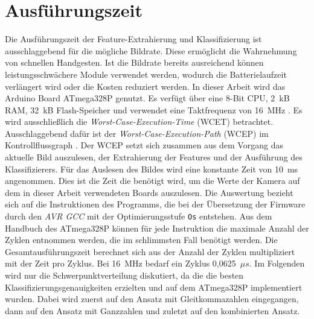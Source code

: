 \section{Ausführungszeit}
\label{sec:eval_speed}
Die Ausführungszeit der Feature-Extrahierung und Klassifizierung ist ausschlaggebend für die mögliche Bildrate. Diese ermöglicht die Wahrnehmung von schnellen Handgesten. Ist die Bildrate bereits ausreichend
können leistungsschwächere Module verwendet werden, wodurch die Batterielaufzeit verlängert wird oder die Kosten reduziert werden.
In dieser Arbeit wird das Arduino Board ATmega328P genutzt. Es verfügt über eine 8-Bit CPU, 2~kB RAM, 32~kB Flash-Speicher und verwendet eine Taktfrequenz von 16~MHz \cite{atmega328p}.
\newline
\newline
Es wird ausschließlich die \textit{Worst-Case-Execution-Time} (WCET) betrachtet. Ausschlaggebend dafür ist der \textit{Worst-Case-Execution-Path} (WCEP) im Kontrollflussgraph \cite{wcc_intro}. Der WCEP
setzt sich zusammen aus dem Vorgang das aktuelle Bild auszulesen, der Extrahierung der Features und der Ausführung des Klassifizierers. Für das Auslesen des Bildes wird eine konstante Zeit von 10~ms angenommen.
Dies ist die Zeit die benötigt wird, um die Werte der Kamera auf dem in dieser Arbeit verwendeten Boards auszulesen.
\newline
\newline
Die Auswertung bezieht sich auf die Instruktionen des Programms, die bei der Übersetzung der Firmware durch den \textit{AVR GCC} mit der Optimierungsstufe \texttt{Os} entstehen. Aus dem Handbuch des
ATmega328P \cite{atmega328p} können für jede Instruktion die maximale Anzahl der Zyklen entnommen werden, die im schlimmsten Fall benötigt werden. Die Gesamtausführungszeit berechnet sich aus der Anzahl der Zyklen
multipliziert mit der Zeit pro Zyklus. Bei 16~MHz bedarf ein Zyklus 0,0625~$\mu s$.
\newline
\newline
Im Folgenden wird nur die Schwerpunktverteilung diskutiert, da die die besten Klassifizierungsgenauigkeiten erzielten und auf dem ATmega328P implementiert wurden. Dabei wird zuerst auf den Ansatz mit Gleitkommazahlen
eingegangen, dann auf den Ansatz mit Ganzzahlen und zuletzt auf den kombinierten Ansatz.





